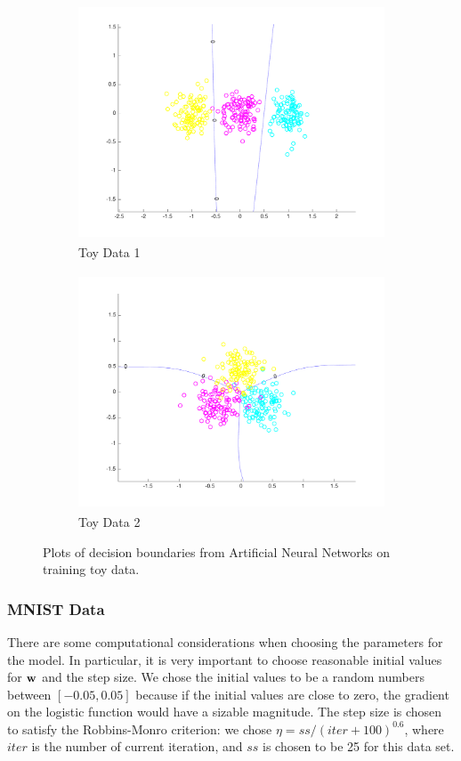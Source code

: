 \begin{figure}[h!]
\centering
    \begin{subfigure}[b]{0.45\textwidth}
	\includegraphics[height=70mm]{plot_toy_multiclass_1.pdf}
	\caption{Toy Data 1}\label{fig:toy_1}
    \end{subfigure}
    \quad
    \begin{subfigure}[b]{0.45\textwidth}
	\includegraphics[height=70mm]{plot_toy_multiclass_2.pdf}
	\caption{Toy Data 2}\label{fig:toy_2}
	\end{subfigure}
    \caption{Plots of decision boundaries from Artificial Neural Networks on training toy data.}  \label{fig:LR_plots}  
\end{figure}


\subsubsection{MNIST Data}

There are some computational considerations when choosing the parameters for the model. In particular, it is very important to choose reasonable initial values for $\boldsymbol{\mathbf{w}}$ and the step size. We chose the initial values to be a random numbers between $[-0.05, 0.05]$ because if the initial values are close to zero, the gradient on the logistic function would have a sizable magnitude. The step size is chosen to satisfy the Robbins-Monro criterion: we chose $\eta = ss/(iter + 100)^{0.6}$, where $iter$ is the number of current iteration, and $ss$ is chosen to be 25 for this data set.


